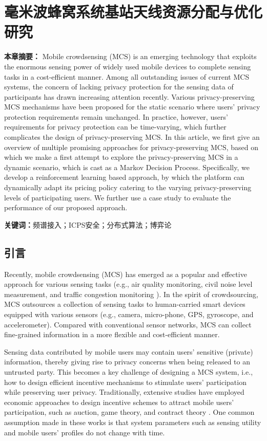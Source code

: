\chapter{毫米波蜂窝系统基站天线资源分配与优化研究}

\textbf{本章摘要：} 
Mobile crowdsensing (MCS) is an emerging technology that exploits the enormous sensing power of widely used mobile devices to complete sensing tasks in a cost-efficient manner. Among all outstanding issues of current MCS systems, the concern of lacking privacy protection for the sensing data of participants has drawn increasing attention recently. Various privacy-preserving MCS mechanisms have been proposed for the static scenario where users' privacy protection requirements remain unchanged. In practice, however, users' requirements for privacy protection can be time-varying, which further complicates the design of privacy-preserving MCS. In this article, we first give an overview of multiple promising approaches for privacy-preserving MCS, based on which we make a first attempt to explore the privacy-preserving MCS in a dynamic scenario, which is cast as a Markov Decision Process. Specifically, we develop a reinforcement learning based approach, by which the platform can dynamically adapt its pricing policy catering to the varying privacy-preserving levels of participating users. We further use a case study to evaluate the performance of our proposed approach.

\textbf{关键词：}频谱接入；ICPS安全；分布式算法；博弈论

\section{引言}
Recently, mobile crowdsensing (MCS) has emerged as a popular and effective approach for various sensing tasks (e.g., air quality monitoring, civil noise level measurement, and traffic congestion monitoring \cite{waze, hu2015smartroad, cheng2014aircloud}). In the spirit of crowdsourcing, MCS outsources a collection of sensing tasks to human-carried smart devices equipped with various sensors (e.g., camera, micro-phone, GPS, gyroscope, and accelerometer). Compared with conventional sensor networks, MCS can collect fine-grained information in a more flexible and cost-efficient manner. 

Sensing data contributed by mobile users may contain users' sensitive (private) information, thereby giving rise to privacy concerns when being released to an untrusted party. This becomes a key challenge of designing a MCS system, i.e., how to design efficient incentive mechanisms to stimulate users' participation while preserving user privacy. Traditionally, extensive studies have employed economic approaches to design incentive schemes to attract mobile users' participation, such as auction, game theory, and contract theory \cite{jin2016, zhang2016privacy, wang2016value}. One common assumption made in these works is that system parameters such as sensing utility and mobile users' profiles do not change with time. 

